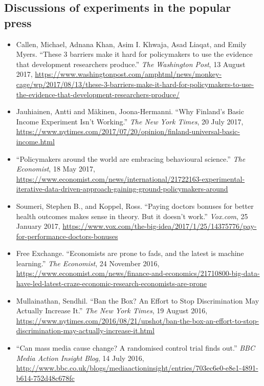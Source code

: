 \documentclass[12pt,a4paper]{article}
\begin{document}
\small

\subsection*{Discussions of experiments in the popular press}

\begin{itemize}
\item Callen, Michael, Adnana Khan, Asim I. Khwaja, Asad Liaqat, and Emily Myers. ``These 3 barriers make it hard for policymakers to use the evidence that development researchers produce.'' \textit{The Washington Post}, 13 August 2017,  \url{https://www.washingtonpost.com/amphtml/news/monkey-cage/wp/2017/08/13/these-3-barriers-make-it-hard-for-policymakers-to-use-the-evidence-that-development-researchers-produce/}

\item Jauhiainen, Antti and M\"{a}kinen, Joona-Hermanni. ``Why Finland's Basic Income Experiment Isn't Working.'' \textit{The New York Times}, 20 July 2017, \url{https://www.nytimes.com/2017/07/20/opinion/finland-universal-basic-income.html}

\item ``Policymakers around the world are embracing behavioural science.'' \textit{The Economist}, 18 May 2017, \url{https://www.economist.com/news/international/21722163-experimental-iterative-data-driven-approach-gaining-ground-policymakers-around}

\item Soumeri, Stephen B., and Koppel, Ross. ``Paying doctors bonuses for better health outcomes makes sense in theory. But it doesn't work.'' \textit{Vox.com}, 25 January 2017, \url{https://www.vox.com/the-big-idea/2017/1/25/14375776/pay-for-performance-doctors-bonuses}

\item Free Exchange. ``Economists are prone to fads, and the latest is machine learning.'' \textit{The Economist}, 24 November 2016, \url{https://www.economist.com/news/finance-and-economics/21710800-big-data-have-led-latest-craze-economic-research-economists-are-prone}

\item Mullainathan, Sendhil. ``Ban the Box? An Effort to Stop Discrimination May Actually Increase It.'' \textit{The New York Times}, 19 August 2016, \url{https://www.nytimes.com/2016/08/21/upshot/ban-the-box-an-effort-to-stop-discrimination-may-actually-increase-it.html}

\item ``Can mass media cause change? A randomised control trial finds out.'' \textit{BBC Media Action Insight Blog}, 14 July 2016, \url{http://www.bbc.co.uk/blogs/mediaactioninsight/entries/703ec6e0-e8e1-4891-b614-752d48c678fc}


\end{itemize}
\end{document}
